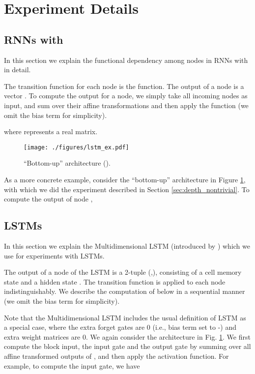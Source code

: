 \newpage



\newpage
\section{Experiment Details}
\subsection{RNNs with }
In this section we explain the functional dependency among nodes in RNNs with  in detail.

The transition function for each node is the  function. The output of a node  is a vector . To compute the output for a node, we simply take all incoming nodes as input, and sum over their affine transformations and then apply the  function (we omit the bias term for simplicity).

where  represents a real matrix.

\begin{figure}[htp]
\center
\texttt{[image: ./figures/lstm\_ex.pdf]}
\vspace{-10pt}
\caption{``Bottom-up'' architecture ().}
\label{fig:bu_ex}
\end{figure}
As a more concrete example, consider the ``bottom-up'' architecture in Figure \ref{fig:bu_ex}, with which we did the experiment described in Section \ref{sec:depth_nontrivial}. To compute the output of node , 


\subsection{LSTMs}
\label{sec:LSTM}
In this section we explain the Multidimensional LSTM (introduced by \cite{Graves2007}) which we use for experiments with LSTMs.

The output of a node  of the LSTM is a 2-tuple (,), consisting of a cell memory state  and a hidden state . The transition function  is applied to each node indistinguishably. We describe the computation of  below in a sequential manner (we omit the bias term for simplicity). 


Note that the Multidimensional LSTM includes the usual definition of LSTM as a special case, where the extra forget gates are 0 (i.e., bias term set to -) and extra weight matrices are 0. We again consider the architecture  in Fig. \ref{fig:bu_ex}. We first compute the block input, the input gate and the output gate by summing over all affine transformed outputs of , and then apply the activation function. For example, to compute the input gate, we have

